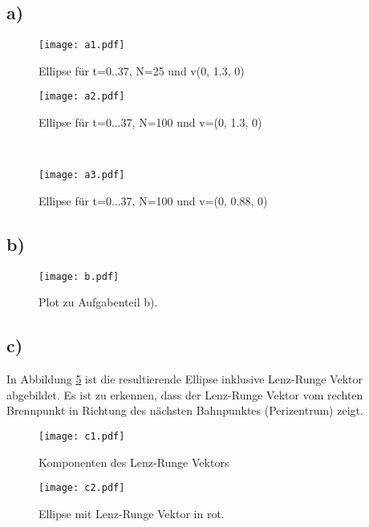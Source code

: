 \documentclass[paper=a4, ngerman]{scrartcl}
\begin{document}
\subsection{a)}

\begin{figure}[!h]
	\centering
	\texttt{[image: a1.pdf]}
	\caption{Ellipse für t=0..37, N=25  und v(0, 1.3, 0)}
	\label{fig:a1}
\end{figure}

\begin{figure}[htbp]
    \centering
    \begin{minipage}{.99\textwidth}
		\centering
		\texttt{[image: a2.pdf]}
		\caption{Ellipse für t=0...37, N=100 und v=(0, 1.3, 0)}
		\label{fig:a2}
    \end{minipage}\\
    \begin{minipage}{.99\textwidth}
		\centering
		\texttt{[image: a3.pdf]}
		\caption{Ellipse für t=0...37, N=100 und v=(0, 0.88, 0)}
		\label{fig:a3}
    \end{minipage}
\end{figure} 

\FloatBarrier
\subsection{b)}

\begin{figure}[htbp]
	\centering
	\texttt{[image: b.pdf]}
	\caption{Plot zu Aufgabenteil b).}
	\label{fig:b}
\end{figure}

\FloatBarrier
\subsection{c)}
In Abbildung \ref{fig:c2} ist die resultierende Ellipse inklusive Lenz-Runge Vektor abgebildet. Es ist zu erkennen, dass der Lenz-Runge Vektor vom rechten Brennpunkt in Richtung des nächsten Bahnpunktes (Perizentrum) zeigt.

\begin{figure}[htbp]
	\centering
	\texttt{[image: c1.pdf]}
	\caption{Komponenten des Lenz-Runge Vektors}
	\label{fig:c1}
\end{figure}

\begin{figure}[htbp]
	\centering
	\texttt{[image: c2.pdf]}
	\caption{Ellipse mit Lenz-Runge Vektor in rot.}
	\label{fig:c2}
\end{figure}
\end{document}

